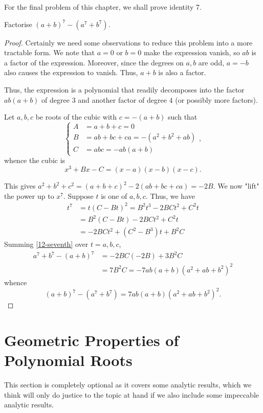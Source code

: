\documentclass[../jarvis.tex]{subfiles}
\begin{document}
For the final problem of this chapter, we shall prove identity 7.
\begin{example}[Classic]
    Factorise $(a+b)^7-(a^7+b^7)$.
\end{example}
\begin{proof}
    Certainly we need some observations to reduce this problem into a more tractable form. We note that $a=0$ or $b=0$ make the expression vanish, so $ab$ is a factor of the expression. Moreover, since the degrees on $a, b$ are odd, $a=-b$ also causes the expression to vanish. Thus, $a+b$ is also a factor.

    Thus, the expression is a polynomial that readily decomposes into the factor $ab(a+b)$ of degree $3$ and another factor of degree $4$ (or possibly more factors).

    Let $a,b,c$ be roots of the cubic with $c=-(a+b)$ such that
    $$\begin{cases}
        A&=a+b+c=0 \\
        B&=ab+bc+ca=-(a^2+b^2+ab) \\
        C&=abc=-ab(a+b)
    \end{cases},$$
    whence the cubic is $$x^3+Bx-C=(x-a)(x-b)(x-c).$$
    
    This gives $a^2+b^2+c^2=(a+b+c)^2-2(ab+bc+ca)=-2B$. We now "lift" the power up to $x^7$. Suppose $t$ is one of $a,b,c$. Thus, we have
    \begin{align}
        t^7&=t(C-Bt)^2=B^2t^3-2BCt^2+C^2t \\
        &=B^2(C-Bt)-2BCt^2+C^2t \\
        &=-2BCt^2+(C^2-B^3)t+B^2C \label{12-seventh}
    \end{align}
    Summing \eqref{12-seventh} over $t=a,b,c$,
    \begin{align*}
        a^7+b^7-(a+b)^7&=-2BC(-2B)+3B^2C\\
        &=7B^2C=-7ab(a+b)(a^2+ab+b^2)^2
    \end{align*}
    whence $$(a+b)^7-(a^7+b^7)=7ab(a+b)(a^2+ab+b^2)^2.$$
\end{proof}

\section{Geometric Properties of Polynomial Roots \hard}
This section is completely optional as it covers some analytic results, which we think will only do justice to the topic at hand if we also include some impeccable analytic results.
\end{document}
